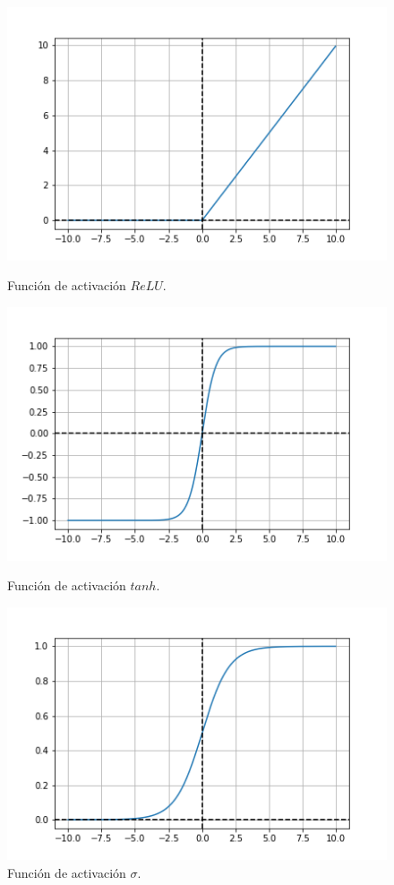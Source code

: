 \begin{figure}
    \centering
    \begin{minipage}[b]{0.4\textwidth}
      \includegraphics[scale=0.5]{figures/relu.png}
      \caption{Función de activación $ReLU$.}
      \label{fig:nn_relu}
    \end{minipage}
    \hfill
    \begin{minipage}[b]{0.4\textwidth}
      \includegraphics[scale=0.5]{figures/tanh.png}
      \caption{Función de activación $tanh$.}
      \label{fig:nn_tanh}
    \end{minipage}
    \begin{minipage}[b]{0.4\textwidth}
      \includegraphics[scale=0.5]{figures/sigmoid.png}
      \caption{Función de activación $\sigma$.}
      \label{fig:nn_sigmoid}
    \end{minipage}
\end{figure}

